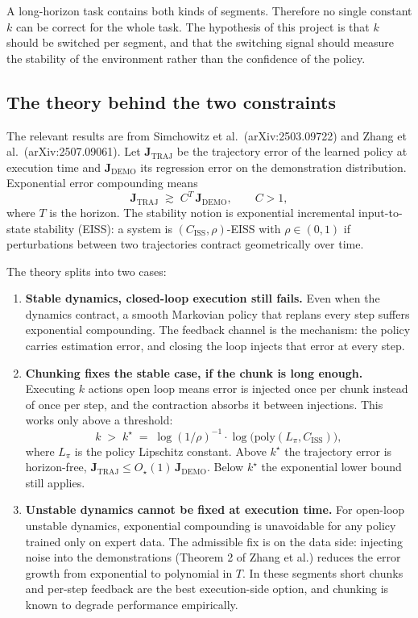\documentclass[11pt]{article}
\newcommand{\Jtraj}{\mathbf{J}_{\mathrm{TRAJ}}}
\newcommand{\Jdemo}{\mathbf{J}_{\mathrm{DEMO}}}
\newcommand{\Ciss}{C_{\mathrm{ISS}}}
\newcommand{\kstar}{k^{\star}}
\begin{document}
A long-horizon task contains both kinds of segments. Therefore no single constant $k$
can be correct for the whole task. The hypothesis of this project is that $k$ should be
switched per segment, and that the switching signal should measure the stability of the
environment rather than the confidence of the policy.

\subsection{The theory behind the two constraints}

The relevant results are from Simchowitz et al.\ (arXiv:2503.09722) and Zhang et al.\
(arXiv:2507.09061). Let $\Jtraj$ be the trajectory error of the learned policy at
execution time and $\Jdemo$ its regression error on the demonstration distribution.
Exponential error compounding means
\begin{equation}
\Jtraj \;\gtrsim\; C^{T}\,\Jdemo, \qquad C>1,
\end{equation}
where $T$ is the horizon. The stability notion is exponential incremental input-to-state
stability (EISS): a system is $(\Ciss,\rho)$-EISS with $\rho\in(0,1)$ if perturbations
between two trajectories contract geometrically over time.

The theory splits into two cases:
\begin{enumerate}[leftmargin=2em]
  \item \textbf{Stable dynamics, closed-loop execution still fails.} Even when the
        dynamics contract, a smooth Markovian policy that replans every step suffers
        exponential compounding. The feedback channel is the mechanism: the policy
        carries estimation error, and closing the loop injects that error at every step.
  \item \textbf{Chunking fixes the stable case, if the chunk is long enough.} Executing
        $k$ actions open loop means error is injected once per chunk instead of once per
        step, and the contraction absorbs it between injections. This works only above a
        threshold:
        \begin{equation}
        k \;>\; \kstar \;=\; \log(1/\rho)^{-1}\cdot\log\bigl(\mathrm{poly}(L_\pi,\Ciss)\bigr),
        \end{equation}
        where $L_\pi$ is the policy Lipschitz constant. Above $\kstar$ the trajectory
        error is horizon-free, $\Jtraj \leq O_\star(1)\,\Jdemo$. Below $\kstar$ the
        exponential lower bound still applies.
  \item \textbf{Unstable dynamics cannot be fixed at execution time.} For open-loop
        unstable dynamics, exponential compounding is unavoidable for any policy trained
        only on expert data. The admissible fix is on the data side: injecting noise
        into the demonstrations (Theorem 2 of Zhang et al.) reduces the error growth
        from exponential to polynomial in $T$. In these segments short chunks and
        per-step feedback are the best execution-side option, and chunking is known to
        degrade performance empirically.
\end{enumerate}
\end{document}
